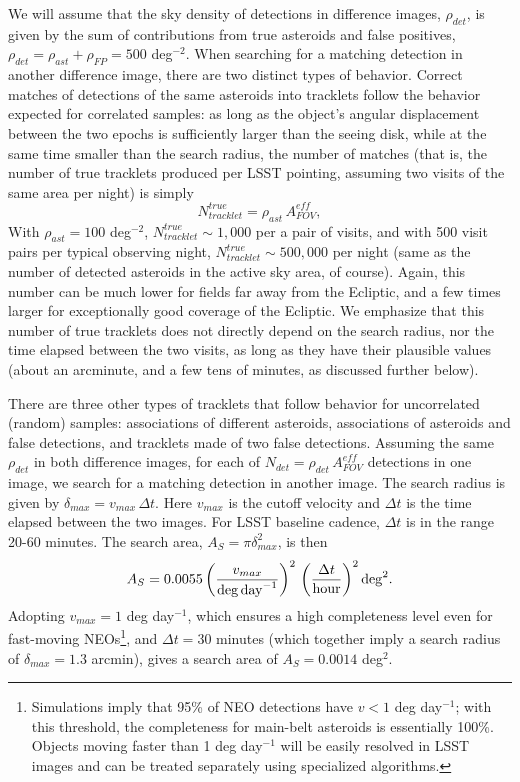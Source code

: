 We will assume that the sky density of detections in difference images, $\rho_{det}$, is given by 
the sum of contributions from true asteroids and false positives, $\rho_{det} = \rho_{ast} + \rho_{FP}
= 500$ deg$^{-2}$. When searching for a matching detection in another difference image, there are
two distinct types of behavior. Correct matches of detections of the same asteroids into tracklets follow the behavior 
expected for correlated samples: as long as the object's angular displacement between the two epochs 
is sufficiently larger than the seeing disk, while at the same time smaller than the search radius, the
number of matches (that is, the number of true tracklets produced per LSST pointing, assuming 
two visits of the same area per night) is simply 
\begin{equation}
                  N_{tracklet}^{true} = \rho_{ast}  \, A_{FOV}^{eff},
\end{equation}
With  $\rho_{ast} = 100$ deg$^{-2}$, $N_{tracklet}^{true} \sim 1,000$ per a pair of visits, and with
500 visit pairs per typical observing night, $N_{tracklet}^{true} \sim 500,000$ per night (same as 
the number of detected asteroids in the active sky area, of course). Again,
this number can be much lower for fields far away from the Ecliptic, and a few times larger
for exceptionally good coverage of the Ecliptic. We emphasize that this number of true tracklets 
does not directly depend on the search radius, nor the time elapsed between the two visits, as long 
as they have their plausible values (about an arcminute, and a few tens of minutes, as discussed 
further below). 

There are three other types of tracklets that follow behavior for uncorrelated (random) 
samples: associations of different asteroids, associations of asteroids and false detections, 
and tracklets made of two false detections. Assuming the same $\rho_{det}$ in both 
difference images, for each of $N_{det} = \rho_{det} \, A_{FOV}^{eff}$ detections in one image,
we search for a matching detection in another image. The search radius is given by 
$\delta_{max} = v_{max} \, \Delta t$. Here $v_{max}$ is the  cutoff velocity and $\Delta t$ 
is the time elapsed between the two images. For LSST baseline cadence, $\Delta t$ is in 
the range 20-60 minutes. The search area, $A_S = \pi \delta_{max}^2$, is then 
\begin{equation}
     A_S = 0.0055 \left( v_{max}  \over {\rm deg \, day}^{-1} \right)^2 \, \left(\Delta t \over {\rm hour} \right)^2 {\rm deg}^2.
\end{equation}
Adopting $v_{max} = 1$ deg day$^{-1}$, which ensures a high completeness level even for fast-moving 
NEOs\footnote{Simulations imply that 95\% of NEO detections have $v<1$ deg day$^{-1}$; with this threshold,
the completeness for main-belt asteroids is essentially 100\%. Objects moving faster than 1 deg day$^{-1}$ will
be easily resolved in LSST images and can be treated separately using specialized algorithms.}, and $\Delta t = 30$
minutes (which together  imply a search radius of $\delta_{max} = 1.3$ arcmin), gives a search area of 
$A_S = 0.0014$ deg$^2$. 

